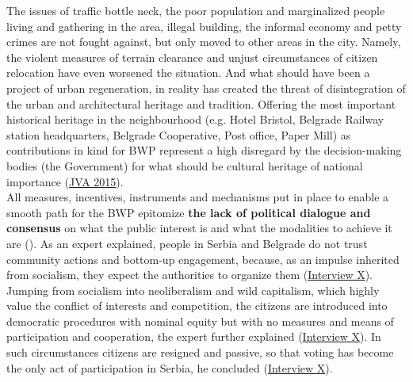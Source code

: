 \documentclass[11pt]{report}
\begin{document}
{{{{The issues of traffic bottle neck, the poor population and marginalized people living and gathering in the area, illegal building, the informal economy and petty crimes are not fought against, but only moved to other areas in the city. Namely, the violent measures of terrain clearance and unjust circumstances of citizen relocation have even worsened the situation. And what should have been a project of urban regeneration, in reality has created the threat of disintegration of the urban and architectural heritage and tradition. Offering the most important historical heritage in the neighbourhood (e.g. Hotel Bristol, Belgrade Railway station headquarters, Belgrade Cooperative, Post office, Paper Mill) as contributions in kind for BWP represent a high disregard by the decision-making bodies (the Government) for what should be cultural heritage of national importance  (\href{JVA}{JVA 2015}).
\\

All measures, incentives, instruments and mechanisms put in place to enable a smooth path for the BWP epitomize \textbf{the lack of political dialogue and consensus} on what the public interest is and what the modalities to achieve it are 
(\href{Vujosevic}{\citealt{vujosevic_post-socialist_2010}}).
As an expert explained, people in Serbia and Belgrade do not trust community actions and bottom-up engagement, because, as an impulse inherited from socialism, they expect the authorities to organize them
(\href{InterviewX}{Interview X}).
Jumping from socialism into neoliberalism and wild capitalism, which highly value the conflict of interests and competition, the citizens are introduced into democratic procedures with nominal equity but with no measures and means of participation and cooperation, the expert further explained (\href{InterviewX}{Interview X}).
In such circumstances citizens are resigned and passive, so that voting has become the only act of participation in Serbia, he concluded (\href{InterviewX}{Interview X}).
\\

}}}}
\end{document}
